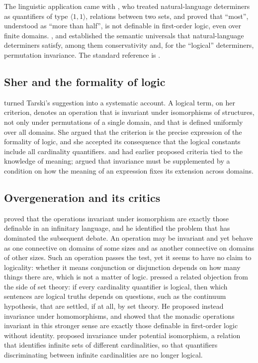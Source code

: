 \documentclass{situationist-preprint}
\begin{document}
The linguistic application came with \citet{BarwiseCooper1981}, who treated natural-language determiners as quantifiers of type $\langle 1, 1\rangle$, relations between two sets, and proved that \enquote{most}, understood as \enquote{more than half}, is not definable in first-order logic, even over finite domains. \citet{vanBenthem1986}, \citet{Westerstahl1985} and \citet{KeenanStavi1986} established the semantic universals that natural-language determiners satisfy, among them conservativity and, for the \enquote{logical} determiners, permutation invariance. The standard reference is \citet{PetersWesterstahl2006}.

\subsection{Sher and the formality of logic}

\citet{Sher1991} turned Tarski's suggestion into a systematic account. A logical term, on her criterion, denotes an operation that is invariant under isomorphisms of structures, not only under permutations of a single domain, and that is defined uniformly over all domains. She argued that the criterion is the precise expression of the formality of logic, and she accepted its consequence that the logical constants include all cardinality quantifiers. \citet{McCarthy1981} and \citet{Peacocke1976} had earlier proposed criteria tied to the knowledge of meaning; \citet{McCarthy1981} argued that invariance must be supplemented by a condition on how the meaning of an expression fixes its extension across domains.

\subsection{Overgeneration and its critics}

\citet{McGee1996} proved that the operations invariant under isomorphism are exactly those definable in an infinitary language, and he identified the problem that has dominated the subsequent debate. An operation may be invariant and yet behave as one connective on domains of some sizes and as another connective on domains of other sizes. Such an operation passes the test, yet it seems to have no claim to logicality: whether it means conjunction or disjunction depends on how many things there are, which is not a matter of logic. \citet{Feferman1999} pressed a related objection from the side of set theory: if every cardinality quantifier is logical, then which sentences are logical truths depends on questions, such as the continuum hypothesis, that are settled, if at all, by set theory. He proposed instead invariance under homomorphisms, and showed that the monadic operations invariant in this stronger sense are exactly those definable in first-order logic without identity. \citet{Bonnay2008} proposed invariance under potential isomorphism, a relation that identifies infinite sets of different cardinalities, so that quantifiers discriminating between infinite cardinalities are no longer logical.
\end{document}
